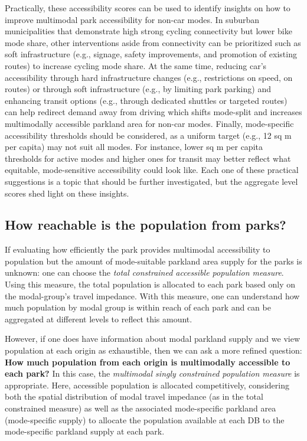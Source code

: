 \documentclass[
11pt, %
oneside, %
english, %
singlespacing, %
]{macthesis} %
\begin{document}
Practically, these accessibility scores can be used to identify insights on how to improve multimodal park accessibility for non-car modes. In suburban municipalities that demonstrate high strong cycling connectivity but lower bike mode share, other interventions aside from connectivity can be prioritized such as soft infrastructure (e.g., signage, safety improvements, and promotion of existing routes) to increase cycling mode share. At the same time, reducing car's accessibility through hard infrastructure changes (e.g., restrictions on speed, on routes) or through soft infrastructure (e.g., by limiting park parking) and enhancing transit options (e.g., through dedicated shuttles or targeted routes) can help redirect demand away from driving which shifts mode-split and increases multimodally accessible parkland area for non-car modes. Finally, mode-specific accessibility thresholds should be considered, as a uniform target (e.g., 12 sq m per capita) may not suit all modes. For instance, lower sq m per capita thresholds for active modes and higher ones for transit may better reflect what equitable, mode-sensitive accessibility could look like. Each one of these practical suggestions is a topic that should be further investigated, but the aggregate level scores shed light on these insights.

\subsection{\texorpdfstring{\textbf{How reachable is the population from parks?}}{How reachable is the population from parks?}}\label{how-reachable-is-the-population-from-parks}

If evaluating how efficiently the park provides multimodal accessibility to population but the amount of mode-suitable parkland area supply for the parks is unknown: one can choose the \emph{total constrained accessible population measure}. Using this measure, the total population is allocated to each park based only on the modal-group's travel impedance. With this measure, one can understand how much population by modal group is within reach of each park and can be aggregated at different levels to reflect this amount.

However, if one does have information about modal parkland supply and we view population at each origin as exhaustible, then we can ask a more refined question: \textbf{How much population from each origin is multimodally accessible to each park?} In this case, the \emph{multimodal singly constrained population measure} is appropriate. Here, accessible population is allocated competitively, considering both the spatial distribution of modal travel impedance (as in the total constrained measure) as well as the associated mode-specific parkland area (mode-specific supply) to allocate the population available at each DB to the mode-specific parkland supply at each park.
\end{document}
